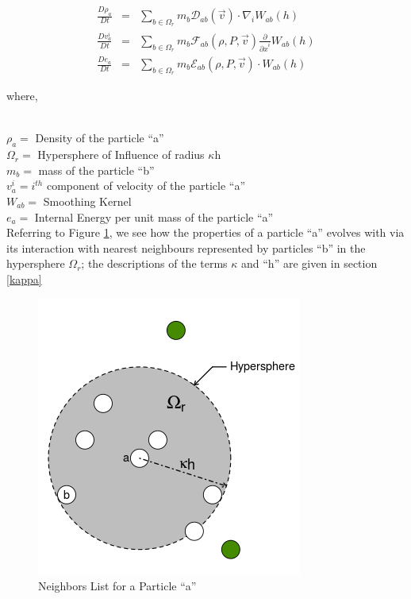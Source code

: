 \newpage

\begin{eqnarray}\label{eq:Disc_SPH}
 \frac{D\rho_{a}}{Dt} &=& \sum_{b \in \Omega_{r}} m_{b}{\mathcal{D}}_{ab}(\vec{v})\cdot {\nabla}_{i} W_{ab}(h) \nonumber \\
 \frac{Dv^{i}_{a}}{Dt} &=& \sum_{b \in \Omega_{r}} m_{b}{\mathcal{F}}_{ab}(\rho ,P,\vec{v})\frac{\partial}{{\partial x}^{i}}W_{ab}(h)\\
 \frac{De_{a}}{Dt} &=& \sum_{b \in \Omega_{r}} m_{b}{\mathcal{E}}_{ab}(\rho ,P,\vec{v}) \cdot W_{ab}(h) \nonumber
\end{eqnarray}

{\raggedright{where,}}\\
${\rho}_a = $ Density of the particle ``a'' \\
$\Omega_{r} = $ Hypersphere of Influence of radius $\kappa$h\\
$m_b = $ mass of the particle ``b''\\ 
$v^{i}_{a} = i^{th}$ component of velocity of the particle ``a'' \\
$W_{ab} = $ Smoothing Kernel\\
$e_a = $ Internal Energy per unit mass of the particle ``a''\\

Referring to Figure \ref{fig:nearest_neighbors}, we see how the properties of a particle ``a'' evolves with via its interaction with nearest neighbours represented by particles ``b'' in the hypersphere $\Omega_{r}$; the descriptions of the terms $\kappa$ and ``h''  are given in section \ref{kappa}

\begin{figure}[htb!]
\centering
\setlength\fboxsep{0pt}
      \includegraphics[scale=0.6]{figures/SpInfDiscrete_R.png} 
\caption{{\small{Neighbors List for a Particle ``a''}}}
\label{fig:nearest_neighbors}
\end{figure}

